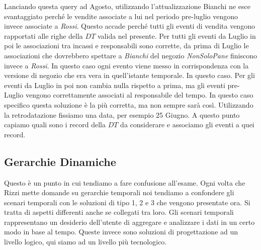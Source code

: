 \noindent Lanciando questa query ad Agosto, utilizzando l'attualizzazione Bianchi ne esce svantaggiato perché le vendite associate a lui nel periodo pre-luglio vengono invece associate a \textit{Rossi}. Questo accade perché tutti gli eventi di vendita vengono rapportati alle righe della $DT$ valida nel presente. Per tutti gli eventi da Luglio in poi le associazioni tra incassi e responsabili sono corrette, da prima di Luglio le associazioni che dovrebbero spettare a \textit{Bianchi} del negozio \textit{NonSoloPane} finiscono invece a \textit{Rossi}.
\noindent In questo caso ogni evento viene messo in corrispondenza con la versione di negozio che era vera in quell'istante temporale. In questo caso. Per gli eventi da Luglio in poi non cambia nulla rispetto a prima, ma gli eventi pre-Luglio vengono correttamente associati al responsabile del tempo. In questo caso specifico questa soluzione è la più corretta, ma non sempre sarà così.
\noindent Utilizzando la retrodatazione fissiamo una data, per esempio 25 Giugno. A questo punto capiamo quali sono i record della $DT$ da considerare e associamo gli eventi a quei record.\newline\newline
\subsection{Gerarchie Dinamiche}
\begin{warn}
	Questo è un punto in cui tendiamo a fare confusione all'esame. Ogni volta che Rizzi mette domande su gerarchie temporali noi tendiamo a confondere gli scenari temporali con le soluzioni di tipo 1, 2 e 3 che vengono presentate ora. Si tratta di aspetti differenti anche se collegati tra loro. Gli scenari temporali rappresentano un desiderio dell'utente di aggregare e analizzare i dati in un certo modo in base al tempo. Queste invece sono soluzioni di progettazione ad un livello logico, qui siamo ad un livello più tecnologico.
\end{warn}

